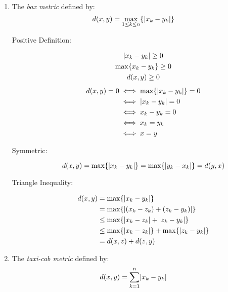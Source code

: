\documentclass[letterpaper,12pt,fleqn]{article}
\begin{document}
\begin{examples}[Exercise 9.1]
\begin{enumerate}
  \item The \emph{box metric} defined by:
    \[d(x,y)=\max_{1\le k\le n}\{\lvert x_k-y_k\rvert\}\]

    \begin{description}
    \item[Positive Definition:]
      \begin{gather*}
        \lvert x_k-y_k\rvert\ge0 \\
        \max\{x_k-y_k\}\ge0 \\
        d(x,y)\ge0
      \end{gather*}
      \begin{align*}
        d(x,y)=0 &\iff \max\{\lvert x_k-y_k\rvert\}=0 \\
        &\iff \lvert x_k-y_k\rvert=0 \\
        &\iff x_k-y_k=0 \\
        &\iff x_k=y_k \\
        &\iff x=y
      \end{align*}
    \item[Symmetric:]
      \[d(x,y)=\max\{\lvert x_k-y_k\rvert\}=\max\{\lvert y_k-x_k\rvert\}=d(y,x)\]
    \item[Triangle Inequality:]
      \begin{align*}
        d(x,y) &= \max\{\lvert x_k-y_k\rvert\} \\
        &= \max\{\lvert(x_k-z_k)+(z_k-y_k)\rvert\} \\
        &\le \max\{\lvert x_k-z_k\rvert+\lvert z_k-y_k\rvert\} \\
        &\le \max\{\lvert x_k-z_k\rvert\}+\max\{\lvert z_k-y_k\rvert\} \\
        &= d(x,z)+d(z,y)
      \end{align*}
    \end{description}

  \item The \emph{taxi-cab metric} defined by:
    \[d(x,y)=\sum_{k=1}^n\lvert x_k-y_k\rvert\]


\end{enumerate}
\end{examples}
\end{document}
